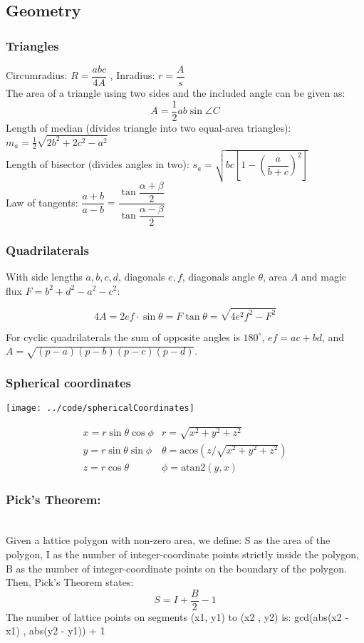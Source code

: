 \subsection{Geometry}
\subsubsection{Triangles}
Circumradius: $R=\dfrac{abc}{4A}$ , Inradius: $r=\dfrac{A}{s}$\\
The area of a triangle using two sides and the included angle can be given as:  \[ A = \frac{1}{2} ab \sin \angle C \]
Length of median (divides triangle into two equal-area triangles): $m_a=\tfrac{1}{2}\sqrt{2b^2+2c^2-a^2}$\\
Length of bisector (divides angles in two): $s_a=\sqrt{bc\left[1-\left(\dfrac{a}{b+c}\right)^2\right]}$\\
Law of tangents: $\dfrac{a+b}{a-b}=\dfrac{\tan\dfrac{\alpha+\beta}{2}}{\tan\dfrac{\alpha-\beta}{2}}$\\
\subsubsection{Quadrilaterals}
With side lengths $a,b,c,d$, diagonals $e, f$, diagonals angle $\theta$, area $A$ and
magic flux $F=b^2+d^2-a^2-c^2$:

\[ 4A = 2ef \cdot \sin\theta = F\tan\theta = \sqrt{4e^2f^2-F^2} \]

 For cyclic quadrilaterals the sum of opposite angles is $180^\circ$,
$ef = ac + bd$, and $A = \sqrt{(p-a)(p-b)(p-c)(p-d)}$.

\subsubsection{Spherical coordinates}
\centerline{\texttt{[image: ../code/sphericalCoordinates]}}
\[\begin{array}{cc}
x = r\sin\theta\cos\phi & r = \sqrt{x^2+y^2+z^2}\\
y = r\sin\theta\sin\phi & \theta = \textrm{acos}(z/\sqrt{x^2+y^2+z^2})\\
z = r\cos\theta & \phi = \textrm{atan2}(y,x)
\end{array}\]

\subsubsection{Pick's Theorem:} \\
  Given a lattice polygon with non-zero area, we define: S as the area of the polygon, I as the number of integer-coordinate points strictly inside the polygon, B as the number of integer-coordinate points on the boundary of the polygon.
  Then, Pick's Theorem states: $$S=I+\frac{B}{2}-1$$
  The number of lattice points on segments (x1, y1) to (x2 , y2) is: gcd(abs(x2 - x1) , abs(y2 - y1)) + 1

